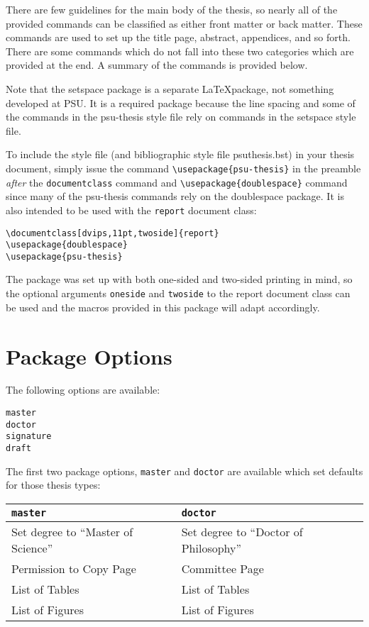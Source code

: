 \documentclass[11pt]{article}
\begin{document}
\begin{singlespace}
There are few guidelines for the main body of the thesis, so nearly all of the
provided commands can be classified as either front matter or back matter. 
These commands are used to set up the title page, abstract, appendices, and so
forth.  There are some commands which do not fall into these two categories
which are provided at the end.  A summary of the commands is provided below.

Note that the setspace package is a separate \LaTeX package, not something
developed at PSU.  It is a required package because the line spacing and some of
the commands in the psu-thesis style file rely on commands in the setspace style
file.  

To include the style file (and bibliographic style file psuthesis.bst) in your
thesis document, simply issue the command \verb+\usepackage{psu-thesis}+ in the
preamble \emph{after} the \verb+documentclass+ command  and
\verb+\usepackage{doublespace}+ command since many of the psu-thesis commands
rely on the doublespace package.  It is also intended to be used with the
\verb+report+ document class:

\begin{verbatim}
\documentclass[dvips,11pt,twoside]{report}
\usepackage{doublespace}
\usepackage{psu-thesis}

\end{verbatim}

The package was set up with both one-sided and two-sided printing in mind, so
the optional arguments \verb+oneside+ and \verb+twoside+ to the report document
class can be used and the macros provided in this package will adapt
accordingly.

\section*{Package Options}

The following options are available:
\begin{verbatim}
master
doctor
signature
draft
\end{verbatim}

The first two package options, \verb+master+ and \verb+doctor+ are available
which set defaults for those thesis types:

\begin{tabular}{ll}
\verb+master+ & \verb+doctor+ \\ \hline
Set degree to ``Master of Science'' & Set degree to ``Doctor of Philosophy'' \\
Permission to Copy Page             & Committee Page  \\
List of Tables                      & List of Tables    \\
List of Figures                     & List of Figures 
\end{tabular}


\end{singlespace}
\end{document}
